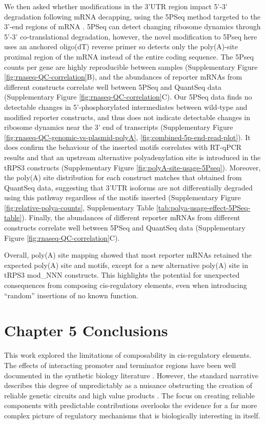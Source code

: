 \documentclass[../main.tex]{subfiles}
\begin{document}
We then asked whether modifications in the 3'UTR region impact 5'-3' degradation following mRNA decapping, using the 5PSeq method targeted to the 3'-end regions of mRNA \parencite{Pelechano2016}.
5PSeq can detect changing ribosome dynamics through 5'-3' co-translational degradation, however, the novel modification to 5Pseq here uses an anchored oligo(dT) reverse primer so detects only the poly(A)-site proximal region of the mRNA instead of the entire coding sequence.
The 5Pseq counts per gene are highly reproducible between samples (Supplementary Figure \ref{fig:rnaseq-QC-correlation}B), and the abundances of reporter mRNAs from different constructs correlate well between 5PSeq and QuantSeq data (Supplementary Figure \ref{fig:rnaseq-QC-correlation}C).
Our 5PSeq data finds no detectable changes in 5'-phosphorylated intermediates between wild-type and modified reporter constructs, and thus does not indicate detectable changes in ribosome dynamics near the 3' end of transcripts (Supplementary Figure \ref{fig:rnaseq-QC-genomic-vs-plasmid-polyA}, \ref{fig:combined-5p-end-read-plot}).
It does confirm the behaviour of the inserted motifs correlates with  RT-qPCR results and that an upstream alternative polyadenylation site is introduced in the tRPS3 constructs (Supplementary Figure \ref{fig:polyA-site-usage-5Pseq}).
Moreover, the poly(A) site distribution for each construct matches that obtained from QuantSeq data, suggesting that 3'UTR isoforms are not differentially degraded using this pathway regardless of the motifs inserted (Supplementary Figure \ref{fig:relative-polya-counts}, Supplementary Table \ref{tab:polya-usage-effect-5PSeq-table}).
Finally, the abundances of different reporter mRNAs from different constructs correlate well between
5PSeq and QuantSeq data (Supplementary Figure \ref{fig:rnaseq-QC-correlation}C).

Overall, poly(A) site mapping showed that most reporter mRNAs retained the expected poly(A) site and motifs, except for a new alternative poly(A) site in tRPS3 mod\_NNN constructs.
This highlights the potential for unexpected consequences from composing cis-regulatory elements, even when introducing ``random'' insertions of no known function.


\section{Chapter 5 Conclusions}

This work explored the limitations of composability in cis-regulatory elements. 
The effects of interacting promoter and terminator regions have been well documented in the synthetic biology literature \parencite{Ito2013, Dhillon2020}. 
However, the standard narrative describes this degree of unpredictably as a nuisance obstructing the creation of reliable genetic circuits and high value products \parencite{Kittleson2012}. 
The focus on creating reliable components with predictable contributions overlooks the evidence for a far more complex picture of regulatory mechanisms that is biologically interesting in itself. 
\end{document}
